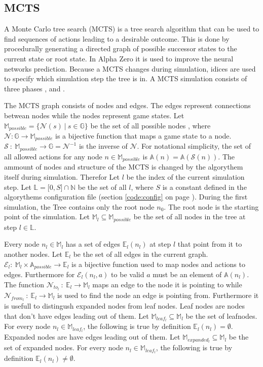 \documentclass[12pt]{article}
\newcommand{\sectionref}[1]{section \ref{#1} on page \pageref{#1}}
\begin{document}
\subsection{MCTS}
A Monte Carlo tree search (MCTS) is a tree search algorithm that can be used to find sequences of actions leading to a desirable outcome. This is done by procedurally generating a directed graph of possible successor states to the current state or root state. In Alpha Zero it is used to improve the neural networks prediction.
Because a MCTS changes during simulation, idices are used to specify which simulation step the tree is in. A MCTS simulation consists of three phases ,  and .

The MCTS graph consists of nodes and edges. The edges represent connections betwean nodes while the nodes represent game states. Let \(\mathbb{M}_{possible} = \{\mathcal{N}(s)~|~ s \in \mathbb{G}\}\) be the set of all possible nodes , where \(\mathcal{N}:\mathbb{G}\to\mathbb{M}_{possible}\) is a bijective function that maps a game state to a node. \(\mathcal{S}~:~\mathbb{M}_{possible}\to\mathbb{G} = \mathcal{N}^{-1}\) is the inverse of \(\mathcal{N}\). For notational simplicity, the set of all allowed actions for any node \(n\in\mathbb{M}_{possible}\) is \(\mathbb{A}(n) = \mathbb{A}(\mathcal{S}(n))\). The ammount of nodes and structure of the MCTS is changed by the algorythem itself during simulation. Therefor Let \(l\) be the index of the current simulation step. Let \(\mathbb L = \mathbb [0, S]\cap\mathbb N\) be the set of all \(l\), where \(S\) is a constant defined in the algorythems configuration file (\sectionref{code:config}). During the first simulation, the Tree contains only the root node \(n_0\). The root node is the starting point of the simulation. Let \(\mathbb{M}_l \subseteq \mathbb{M}_{possible}\) be the set of all nodes in the tree at step \(l\in\mathbb L\).

 Every node \(n_l \in \mathbb{M}_l\) has a set of edges \(\mathbb{E}_l(n_l)\) at step \(l\) that point from it to another nodes. Let \(\mathbb{E}_l\) be the set of all edges in the current graph. \(\mathcal{E}_l:~\mathbb{M}_l\times \mathbb{A}_{possible} \to \mathbb{E}_l\) is a bijective function used to map nodes and actions to edges. Furthermore for \(\mathcal{E}_l(n_l, a)\) to be valid \(a\) must be an element of \(\mathbb{A}(n_l)\).  The function \(\mathcal{N}_{to_l}~:~\mathbb{E}_{l}\to\mathbb{M}_l\) maps an edge to the node it is pointing to while \(\mathcal{N}_{from_l}~:~\mathbb{E}_{l}\to\mathbb{M}_l\) is used to find the node an edge is pointing from.
Furthermore it is usefull to distingush expanded nodes from leaf nodes. Leaf nodes are nodes that don't have edges leading out of them. Let \(\mathbb{M}_{leaf_l} \subseteq \mathbb{M}_l\) be the set of leafnodes. For every node \(n_l\in \mathbb{M}_{leaf_l}\), the following is true by definition \(\mathbb{E}_l(n_l) = \emptyset\). Expanded nodes are have edges leading out of them. Let \(\mathbb{M}_{expanded_l} \subseteq \mathbb{M}_l\) be the set of expanded nodes. For every node \(n_l\in \mathbb{M}_{leaf_l}\), the following is true by definition \(\mathbb{E}_l(n_l) \neq \emptyset\).
\end{document}
